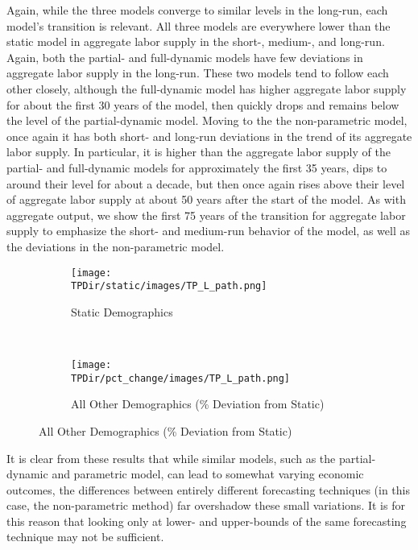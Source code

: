 \documentclass[10pt]{article}
\numberwithin{equation}{subsection}
\newcommand*{\TPDir}{../../code/Rick/OUTPUT/TP}
\begin{document}
\par Again, while the three models converge to similar levels in the long-run, each model's transition is relevant. All three models are everywhere lower than the static model in aggregate labor supply in the \mbox{short-,} \mbox{medium-,} and long-run. Again, both the partial- and full-dynamic models have few deviations in aggregate labor supply in the long-run. These two models tend to follow each other closely, although the full-dynamic model has higher aggregate labor supply for about the first 30 years of the model, then quickly drops and remains below the level of the partial-dynamic model. Moving to the the non-parametric model, once again it has both short- and long-run deviations in the trend of its aggregate labor supply. In particular, it is higher than the aggregate labor supply of the partial- and full-dynamic models for approximately the first 35 years, dips to around their level for about a decade, but then once again rises above their level of aggregate labor supply at about 50 years after the start of the model. As with aggregate output, we show the first 75 years of the transition for aggregate labor supply to emphasize the short- and medium-run behavior of the model, as well as the deviations in the non-parametric model.

\begin{figure}[H]
   \caption{\label{fig:tp_L_pct}Time Path of Aggregate Labor Supply \(\hat{L}_t\)}
   \begin{subfigure}{0.5\textwidth}
      \centering
      \texttt{[image: \\TPDir/static/images/TP\_L\_path.png]}
      \caption{Static Demographics}
   \end{subfigure}%
   ~
   \begin{subfigure}{0.5\textwidth}
      \centering
      \texttt{[image: \\TPDir/pct\_change/images/TP\_L\_path.png]}
      \caption{All Other Demographics (\% Deviation from Static)}
   \end{subfigure}
\end{figure}

It is clear from these results that while similar models, such as the partial-dynamic and parametric model, can lead to somewhat varying economic outcomes, the differences between entirely different forecasting techniques (in this case, the non-parametric method) far overshadow these small variations. It is for this reason that looking only at lower- and upper-bounds of the same forecasting technique may not be sufficient.
\end{document}
